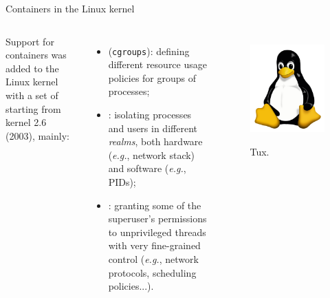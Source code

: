 \begin{frame}{Containers in the Linux kernel}
	\begin{columns}
		Support for containers was added to the Linux kernel with a set of  starting from kernel 2.6 (2003), mainly:
		\begin{itemize}
			\item {} (\texttt{cgroups}): defining different resource usage policies for groups of processes;
			\item {}: isolating processes and users in different \emph{realms}, both hardware (\emph{e.g.}, network stack) and software (\emph{e.g.}, PIDs);
			\item {}: granting some of the superuser's permissions to unprivileged threads with very fine-grained control (\emph{e.g.}, network protocols, scheduling policies...).
		\end{itemize}

		\begin{figure}
			\centering
			\includegraphics[scale=.2]{tux.png}
			\label{fig:tux}
			\caption{Tux.}
		\end{figure}
	\end{columns}
\end{frame}
